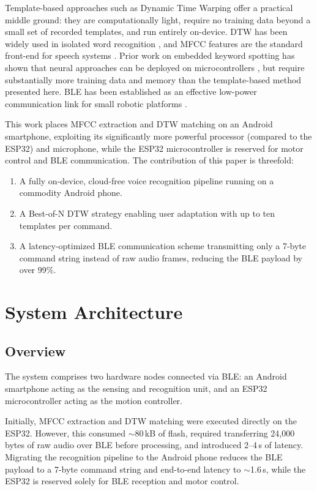 \documentclass[conference]{IEEEtran}
\begin{document}
Template-based approaches such as Dynamic Time Warping offer a practical
middle ground: they are computationally light, require no training data
beyond a small set of recorded templates, and run entirely on-device.
DTW has been widely used in isolated word recognition \cite{sakoe1978dtw},
and MFCC features are the standard front-end for speech systems \cite{davis1980mfcc}.
Prior work on embedded keyword spotting has shown that neural approaches
can be deployed on microcontrollers \cite{zhang2017hello, choi2019iot}, but
require substantially more training data and memory than the template-based
method presented here. BLE has been established as an effective low-power
communication link for small robotic platforms \cite{mikhaylov2013ble}.

This work places MFCC extraction and DTW matching on an Android
smartphone, exploiting its significantly more powerful processor (compared to the ESP32) and
microphone, while the ESP32 microcontroller is reserved for motor
control and BLE communication. The contribution of this paper is
threefold:
\begin{enumerate}
  \item A fully on-device, cloud-free voice recognition pipeline running
    on a commodity Android phone.
  \item A Best-of-N DTW strategy enabling user adaptation with up to
    ten templates per command.
  \item A latency-optimized BLE communication scheme transmitting only
    a 7-byte command string instead of raw audio frames, reducing the
    BLE payload by over 99\%.
\end{enumerate}

\section{System Architecture} \label{sec:architecture}

\subsection{Overview}
The system comprises two hardware nodes connected via BLE: an Android
smartphone acting as the sensing and recognition unit, and an ESP32
microcontroller acting as the motion controller.

Initially, MFCC extraction and DTW matching were executed directly on
the ESP32. However, this consumed $\sim$80\,kB of flash, required
transferring 24{,}000 bytes of raw audio over BLE before processing,
and introduced 2--4\,s of latency. Migrating the recognition pipeline
to the Android phone reduces the BLE payload to a 7-byte command
string and end-to-end latency to $\sim$1.6\,s, while the ESP32 is
reserved solely for BLE reception and motor control.
\end{document}
